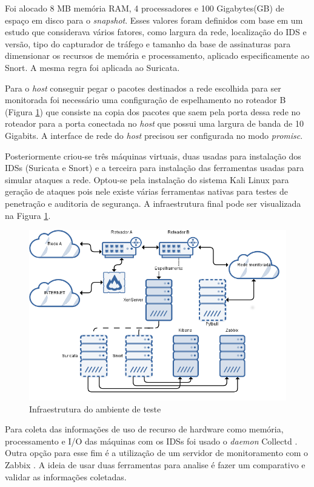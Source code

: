 \documentclass[
	12pt,				
	openright,		
	twoside,	
	a4paper,
	english,	
	brazil	
	]{abntex2}
\begin{document}
 Foi alocado 8 MB memória RAM, 4 processadores e 100 Gigabytes(GB) de espaço em disco para o \textit{snapshot}. Esses valores foram definidos com base em um estudo \cite{mikelococo} que considerava vários fatores, como largura da rede, localização do IDS e versão, tipo do capturador de tráfego e tamanho da base de assinaturas para dimensionar os recursos de memória e processamento, aplicado especificamente ao Snort. A mesma regra foi aplicada ao Suricata.

 Para o \textit{host} conseguir pegar o pacotes destinados a rede escolhida para ser monitorada foi necessário uma configuração de espelhamento no roteador B (Figura \ref{fig:infra-ambiente}) que consiste na copia dos pacotes que saem pela porta dessa rede no roteador para a porta conectada no \textit{host} que possui uma largura de banda de 10 Gigabits. A interface de rede do \textit{host} precisou ser configurada no modo \textit{promisc}.

 Posteriormente criou-se três máquinas virtuais, duas usadas para instalação dos IDSs (Suricata e Snort) e a terceira para instalação das ferramentas usadas para simular ataques a rede. Optou-se pela instalação do sistema Kali Linux \cite{kalilinux} para geração de ataques pois nele existe várias ferramentas nativas para testes de penetração e auditoria de segurança. A infraestrutura final pode ser visualizada na Figura \ref{fig:infra-ambiente}.

 \begin{figure}[!htb]
  \centering
  \includegraphics[scale=.5]{infra.png}
  \caption{Infraestrutura do ambiente de teste}
  \label{fig:infra-ambiente}
 \end{figure}

 Para coleta das informações de uso de recurso de hardware como memória, processamento e I/O das máquinas com os IDSs foi usado o \textit{daemon} Collectd \cite{collectd}. Outra opção para esse fim é a utilização de um servidor de monitoramento com o Zabbix \cite{zabbix}. A ideia de usar duas ferramentas para analise é fazer um comparativo e validar as informações coletadas.
\end{document}
